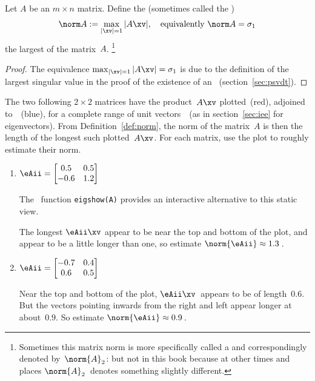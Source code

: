 \begin{definition} \label{def:norm} 
Let \(A\) be an \(m\times n\) matrix.  
Define the  (sometimes called the )
\begin{equation}
\norm A:=\max_{|\xv|=1}|A\xv|, 
\quad\text{equivalently }\norm A=\sigma_1
\label{eq:}
\end{equation}
the largest  of the matrix~\(A\).
\footnote{Sometimes this matrix norm is more specifically called a  and correspondingly denoted by~\(\norm{A}_2\): but not in this book because at other times and places \(\norm{A}_2\)~denotes something slightly different.}
\end{definition}
\begin{proof} 
The equivalence \(\max_{|\xv|=1}|A\xv|=\sigma_1\) is due to the definition of the largest singular value in the proof of the existence of an \svd\ (section~\ref{sec:psvdt}).
\end{proof}



\begin{example} \label{eg:}
The two following \(2\times2\) matrices have the product~\(A\xv\) plotted~(red), adjoined to~\xv~(blue), for a complete range of unit vectors~\xv\ (as in section~\ref{sec:iee} for eigenvectors).
From Definition~\ref{def:norm}, the norm of the matrix~\(A\) is then the length of the longest such plotted~\(A\xv\).
For each matrix, use the plot to roughly estimate their norm.
\begin{enumerate}
\item\label{eg:g2x2norm:a} \(\eAii=\begin{bmatrix} 0.5&0.5\\-0.6&1.2 \end{bmatrix}\)\\
\begin{solution} 
\begin{aside}
The \script[1]\ function \texttt{eigshow(A)} provides an interactive alternative to this static view.
\end{aside}%
The longest \(\eAii\xv\) appear to be near the top and bottom of the plot, and appear to be a little longer than one, so estimate \(\norm{\eAii}\approx 1.3\)\,.
\end{solution}

\item \(\eAii=\begin{bmatrix} {-0.7}&{0.4}\\{0.6}&{0.5} \end{bmatrix}\)\\
\begin{solution} 
Near the top and bottom of the plot, \(\eAii\xv\)~appears to be of length~\(0.6\).   
But the vectors pointing inwards from the right and left appear  longer at about~\(0.9\). 
So estimate \(\norm{\eAii}\approx 0.9\)\,.
\end{solution}

\end{enumerate}
\end{example}




